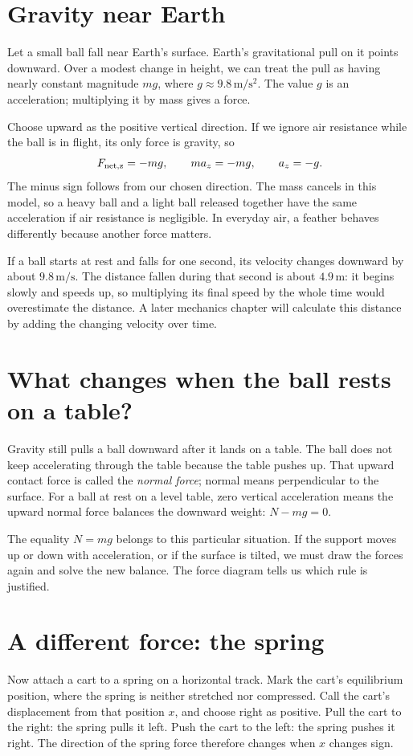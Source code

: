 \documentclass[11pt,oneside]{book}
\theoremstyle{reviewstyle}
\begin{document}
\section{Gravity near Earth}
Let a small ball fall near Earth's surface. Earth's gravitational pull on it points downward. Over a modest change in height, we can treat the pull as having nearly constant magnitude $mg$, where $g\approx9.8\,\mathrm{m/s^2}$. The value $g$ is an acceleration; multiplying it by mass gives a force.

Choose upward as the positive vertical direction. If we ignore air resistance while the ball is in flight, its only force is gravity, so
\begin{equation}
F_{\rm net,z}=-mg,\qquad ma_z=-mg,\qquad a_z=-g.
\end{equation}
The minus sign follows from our chosen direction. The mass cancels in this model, so a heavy ball and a light ball released together have the same acceleration if air resistance is negligible. In everyday air, a feather behaves differently because another force matters.

If a ball starts at rest and falls for one second, its velocity changes downward by about $9.8\,\mathrm{m/s}$. The distance fallen during that second is about $4.9\,\mathrm m$: it begins slowly and speeds up, so multiplying its final speed by the whole time would overestimate the distance. A later mechanics chapter will calculate this distance by adding the changing velocity over time.

\section{What changes when the ball rests on a table?}
Gravity still pulls a ball downward after it lands on a table. The ball does not keep accelerating through the table because the table pushes up. That upward contact force is called the \emph{normal force}; normal means perpendicular to the surface. For a ball at rest on a level table, zero vertical acceleration means the upward normal force balances the downward weight: $N-mg=0$.

The equality $N=mg$ belongs to this particular situation. If the support moves up or down with acceleration, or if the surface is tilted, we must draw the forces again and solve the new balance. The force diagram tells us which rule is justified.

\section{A different force: the spring}
Now attach a cart to a spring on a horizontal track. Mark the cart's equilibrium position, where the spring is neither stretched nor compressed. Call the cart's displacement from that position $x$, and choose right as positive. Pull the cart to the right: the spring pulls it left. Push the cart to the left: the spring pushes it right. The direction of the spring force therefore changes when $x$ changes sign.
\end{document}
